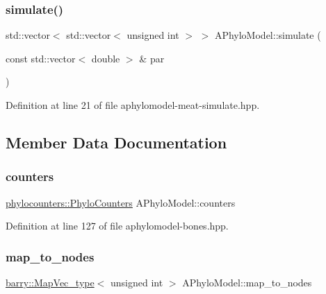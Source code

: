 \subsubsection{\texorpdfstring{simulate()}{simulate()}}
{\footnotesize\ttfamily std\+::vector$<$ std\+::vector$<$ unsigned int $>$ $>$ A\+Phylo\+Model\+::simulate (\begin{DoxyParamCaption}\item[{const std\+::vector$<$ double $>$ \&}]{par }\end{DoxyParamCaption})}



Definition at line 21 of file aphylomodel-\/meat-\/simulate.\+hpp.



\subsection{Member Data Documentation}
\mbox{\label{class_a_phylo_model_ac301d6887933072072bdf3472df5c8a3}} 
\subsubsection{\texorpdfstring{counters}{counters}}
{\footnotesize\ttfamily \hyperlink{namespacebarry_1_1counters_1_1phylo_a4e401ffe66d04091343dcffaf915f8c3}{phylocounters\+::\+Phylo\+Counters} A\+Phylo\+Model\+::counters}



Definition at line 127 of file aphylomodel-\/bones.\+hpp.

\mbox{\label{class_a_phylo_model_ae041cf2aa3630fab0a050e176c9317f9}} 
\subsubsection{\texorpdfstring{map\+\_\+to\+\_\+nodes}{map\_to\_nodes}}
{\footnotesize\ttfamily \hyperlink{namespacebarry_a2f0d3aab1d67e4c8eaeab9022e16139f}{barry\+::\+Map\+Vec\+\_\+type}$<$ unsigned int $>$ A\+Phylo\+Model\+::map\+\_\+to\+\_\+nodes}



